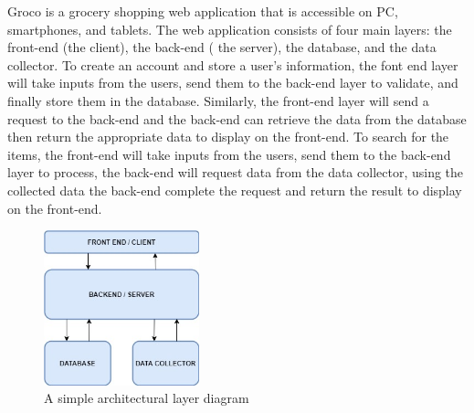 Groco is a grocery shopping web application that is accessible on PC, smartphones, and tablets. The web application consists of four main layers: the front-end (the client), the back-end ( the server), the database, and the data collector. To create an account and store a user's information, the font end layer will take inputs from the users, send them to the back-end layer to validate, and finally store them in the database. Similarly, the front-end layer will send a request to the back-end and the back-end can retrieve the data from the database then return the appropriate data to display on the front-end. To search for the items, the front-end will take inputs from the users, send them to the back-end layer to process, the back-end will request data from the data collector, using the collected data the back-end complete the request and return the result to display on the front-end. 

\begin{figure}[h!]
	\centering
 	\includegraphics[width=0.4\textwidth]{images/ADS_overview.jpg}
 \caption{A simple architectural layer diagram}
\end{figure}


